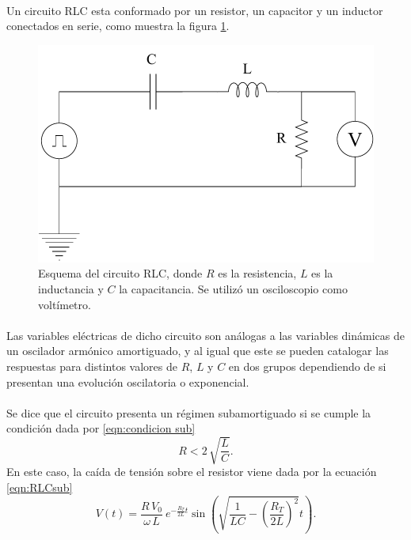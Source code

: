 \paragraph{}
Un circuito RLC esta conformado por un resistor, un capacitor y un inductor conectados en serie, como muestra la figura \ref{esq: RLC}.
\begin{figure}[H]
    \centering
    \includegraphics[scale= 0.5]{Esquemas/RLC.drawio.pdf}
    \caption{Esquema del circuito RLC, donde $R$ es la resistencia, $L$ es la inductancia y $C$ la capacitancia. Se utilizó un osciloscopio como voltímetro.}
    \label{esq: RLC}
\end{figure}
\paragraph{}
Las variables eléctricas de dicho circuito son análogas a las variables dinámicas de un oscilador armónico amortiguado, y al igual que este se pueden catalogar las respuestas para distintos valores de $R$, $L$ y $C$ en dos grupos dependiendo de si presentan una evolución oscilatoria o exponencial.
\paragraph{}
Se dice que el circuito presenta un régimen subamortiguado si se cumple la condición dada por \eqref{eqn:condicion sub}
\begin{equation}\label{eqn:condicion sub}
    R < 2\,\sqrt{\frac{L}{C}}.
\end{equation}
En este caso, la caída de tensión sobre el resistor viene dada por la ecuación \eqref{eqn:RLCsub}
\begin{equation}\label{eqn:RLCsub}
    V(t)=\frac{R \, V_0}{\omega \, L } \ e^{-\frac{R_{T}}{2L}t} \sin \left(\sqrt{\frac{1}{LC}-\left(\frac{R_{T}}{2L}\right)^2 }t\right).
\end{equation}
